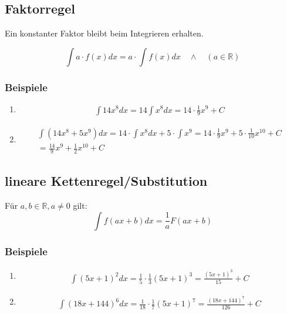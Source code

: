 \documentclass[12pt, a4paper]{report}
\begin{document}
\subsection{Faktorregel}
Ein konstanter Faktor bleibt beim Integrieren erhalten.

\begin{equation}
\int a\cdot f(x)dx = a\cdot \int f(x)dx \quad \land \quad (a \in \mathbb{R})
\end{equation}

\subsubsection{Beispiele}
\begin{fleqn}[\parindent]
\begin{enumerate}
\item
\begin{align*}
\int 14x^8dx = 14\int x^8dx = 14\cdot \frac{1}{9}x^9 + C
\end{align*}

\item
\begin{align*}
\int (14x^8 + 5x^9)dx = 14\cdot \int x^8dx + 5\cdot \int x^9 = 14\cdot \frac{1}{9}x^9 + 5\cdot \frac{1}{10}x^{10} + C\\
= \frac{14}{9}x^9 + \frac{1}{2}x^{10} + C
\end{align*}
\end{enumerate}
\end{fleqn}

\subsection{lineare Kettenregel/Substitution}
Für $a, b \in \mathbb{R}, a \neq 0$ gilt:
\begin{equation}
\int f(ax+b)dx=\frac{1}{a}F(ax+b)
\end{equation}

\subsubsection{Beispiele}

\begin{fleqn}[\parindent]
\begin{enumerate}
\item
\begin{align*}
\int (5x+1)^2dx = \frac{1}{5}\cdot \frac{1}{3} (5x+1)^3 = \frac{(5x+1)^3}{15} + C
\end{align*}
\item
\begin{align*}
\int (18x+144)^6dx = \frac{1}{18}\cdot \frac{1}{7} (5x+1)^7 = \frac{(18x+144)^7}{126} + C
\end{align*}
\end{enumerate}
\end{fleqn}
\end{document}
